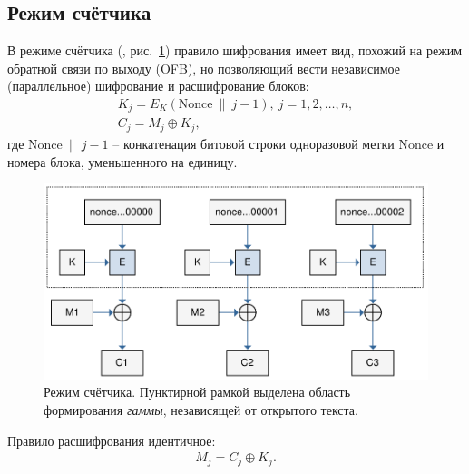 \subsection{Режим счётчика}

В режиме счётчика (, рис.~\ref{fig:CTR}) правило шифрования имеет вид, похожий на режим обратной связи по выходу (OFB), но позволяющий вести независимое (параллельное) шифрование и расшифрование блоков:
\[ \begin{array}{l}
    K_j = E_K(\textrm{Nonce} ~\|~ j - 1), ~ j = 1, 2, \dots, n, \\
    C_j = M_j \oplus K_j,
\end{array} \]
где $\textrm{Nonce} ~\|~ j - 1$ -- конкатенация битовой строки одноразовой метки $\textrm{Nonce}$ и номера блока, уменьшенного на единицу.

\begin{figure}[bt]
	\centering
	\includegraphics[width=1\textwidth]{pic/CTR}
	\caption{Режим счётчика. Пунктирной рамкой выделена область формирования \emph{гаммы}, независящей от открытого текста.}
	\label{fig:CTR}
\end{figure}

Правило расшифрования идентичное:
\[ \begin{array}{l}
    M_j = C_j \oplus K_j. \\
\end{array} \]
